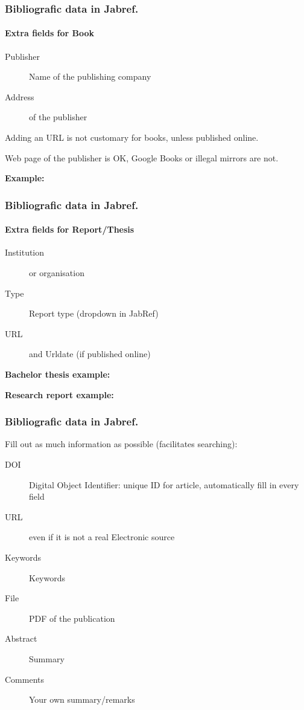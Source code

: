 \documentclass[aspectratio=169]{beamer}
\begin{document}
\begin{frame}[plain]
	\frametitle{Bibliografic data in Jabref.}
	\framesubtitle{Extra fields for Book}
	
	\begin{description}
		\item[Publisher] Name of the publishing company
		\item[Address] of the publisher
	\end{description}
	
	\medskip
	
	Adding an URL is not customary for books, unless published online.
	
	Web page of the publisher is OK, Google Books or illegal mirrors are not.
	
	\medskip
	
	\textbf{Example:}
	
\end{frame}

\begin{frame}
	\frametitle{Bibliografic data in Jabref.}
\framesubtitle{Extra fields for Report/Thesis}
	
	\begin{description}
		\item[Institution] or organisation
		\item[Type] Report type (dropdown in JabRef)
		\item[URL]  and Urldate (if published online)
	\end{description}
	
\end{frame}

\begin{frame}[plain]
	
	\textbf{Bachelor thesis example:}
	
	
	\medskip
	
	\textbf{Research report example:}
	
	
\end{frame}

\begin{frame}
  \frametitle{Bibliografic data in Jabref.}

  Fill out as much information as possible (facilitates searching):

  \begin{description}
    \item[DOI] Digital Object Identifier: unique ID for article, automatically fill in every field
    \item[URL] even if it is not a real Electronic source
    \item[Keywords] Keywords
    \item[File] PDF of the publication
    \item[Abstract] Summary
    \item[Comments] Your own summary/remarks
  \end{description}

\end{frame}
\end{document}
